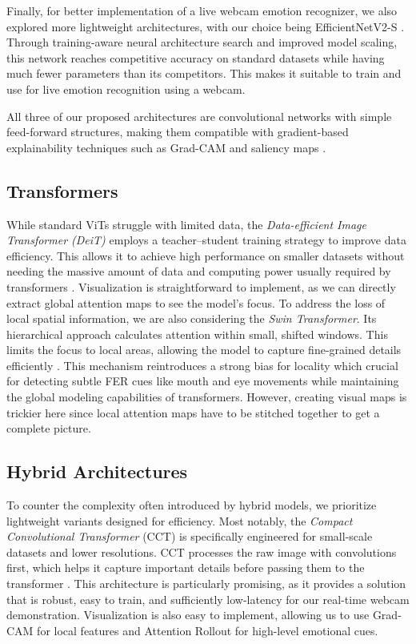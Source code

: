 Finally, for better implementation of a live webcam emotion recognizer, we also explored more lightweight architectures, with our choice being EfficientNetV2-S \cite{tan2021efficientnetv2smallermodelsfaster}. Through training-aware neural architecture search and improved model scaling, this network reaches competitive accuracy on standard datasets while having much fewer parameters than its competitors. This makes it suitable to train and use for live emotion recognition using a webcam.  

All three of our proposed architectures are convolutional networks with simple feed-forward structures, making them compatible with gradient-based explainability techniques such as Grad-CAM and saliency maps \cite{Selvaraju_2019}.

\subsection{Transformers}
While standard ViTs \cite{dosovitskiy2021vit} struggle with limited data, the \textit{Data-efficient Image Transformer (DeiT)} employs a teacher–student training strategy to improve data efficiency. This allows it to achieve high performance on smaller datasets without needing the massive amount of data and computing power usually required by transformers \cite{Touvron2021DeiT}. Visualization is straightforward to implement, as we can directly extract global attention maps to see the model's focus. To address the loss of local spatial information, we are also considering the \textit{Swin Transformer}. Its hierarchical approach calculates attention within small, shifted windows. This limits the focus to local areas, allowing the model to capture fine-grained details efficiently \cite{Liu2021swin}. This mechanism reintroduces a strong bias for locality which crucial for detecting subtle FER cues like mouth and eye movements while maintaining the global modeling capabilities of transformers. However, creating visual maps is trickier here since local attention maps have to be stitched together to get a complete picture.

\subsection{Hybrid Architectures}
To counter the complexity often introduced by hybrid models, we prioritize lightweight variants designed for efficiency. Most notably, the \textit{Compact Convolutional Transformer} (CCT) is specifically engineered for small-scale datasets and lower resolutions. CCT processes the raw image with convolutions first, which helps it capture important details before passing them to the transformer \cite{Hassani2021CCT}. This architecture is particularly promising, as it provides a solution that is robust, easy to train, and sufficiently low-latency for our real-time webcam demonstration. Visualization is also easy to implement, allowing us to use Grad-CAM for local features and Attention Rollout for high-level emotional cues.